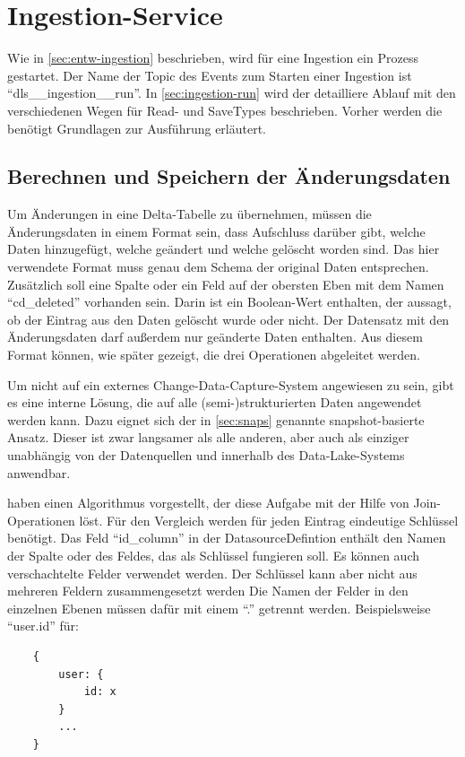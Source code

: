 \section{Ingestion-Service}

Wie in \cref{sec:entw-ingestion} beschrieben, wird für eine Ingestion ein Prozess gestartet.
Der Name der Topic des Events zum Starten einer Ingestion ist "`dls\_\_ingestion\_\_run"'.
In \cref{sec:ingestion-run} wird der detailliere Ablauf mit den verschiedenen Wegen für Read- und SaveTypes beschrieben.
Vorher werden die benötigt Grundlagen zur Ausführung erläutert.

\subsection{Berechnen und Speichern der Änderungsdaten}
Um Änderungen in eine Delta-Tabelle zu übernehmen, müssen die Änderungsdaten in einem Format sein, dass Aufschluss darüber gibt, welche Daten hinzugefügt, welche geändert und welche gelöscht worden sind.
Das hier verwendete Format muss genau dem Schema der original Daten entsprechen.
Zusätzlich soll eine Spalte oder ein Feld auf der obersten Eben mit dem Namen "`cd\_deleted"' vorhanden sein.
Darin ist ein Boolean-Wert enthalten, der aussagt, ob der Eintrag aus den Daten gelöscht wurde oder nicht.
Der Datensatz mit den Änderungsdaten darf außerdem nur geänderte Daten enthalten.
Aus diesem Format können, wie später gezeigt, die drei Operationen abgeleitet werden.

Um nicht auf ein externes Change-Data-Capture-System angewiesen zu sein, gibt es eine interne Lösung, die auf alle (semi-)strukturierten Daten angewendet werden kann.
Dazu eignet sich der in \cref{sec:snaps} genannte snapshot-basierte Ansatz.
Dieser ist zwar langsamer als alle anderen, aber auch als einziger unabhängig von der Datenquellen und innerhalb des Data-Lake-Systems anwendbar.

\textcite{snapshot_algos} haben einen Algorithmus vorgestellt, der diese Aufgabe mit der Hilfe von Join-Operationen löst.
Für den Vergleich werden für jeden Eintrag eindeutige Schlüssel benötigt.
Das Feld "`id\_column"' in der DatasourceDefintion enthält den Namen der Spalte oder des Feldes, das als Schlüssel fungieren soll.
Es können auch verschachtelte Felder verwendet werden.
Der Schlüssel kann aber nicht aus mehreren Feldern zusammengesetzt werden
Die Namen der Felder in den einzelnen Ebenen müssen dafür mit einem "`."' getrennt werden.
Beispielsweise "`user.id"' für: \begin{verbatim}
    {
        user: { 
            id: x 
        }
        ...
    }
\end{verbatim}

